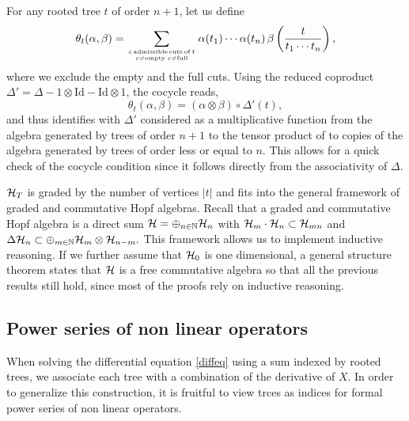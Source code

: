 \documentclass[12pt,here,feynmf]{article}
\begin{document}
For any rooted tree $t$ of order $n+1$, let us define
\begin{equation}
\theta_{t}(\alpha,\beta)=\sum_{c\,\mathrm{admissible \,cuts\, of\,}t\atop c\neq\mathrm{empty}\;c\neq\mathrm{full}
}\alpha(t_{1})\cdots\alpha(t_{n})
\,\beta\left(\frac{t}{t_{1}\cdots t_{n}}\right),
\end{equation}
where we exclude the empty and the full cuts. Using the reduced coproduct $\Delta'=\Delta-1\otimes\mathrm{Id}-\mathrm{Id}\otimes 1$, the cocycle reads, 
\begin{equation}
\theta_{t}(\alpha,\beta)=\left(\alpha\otimes\beta\right)\circ\Delta' (t),
\end{equation}
and thus identifies with $\Delta'$ considered as a multiplicative function from the algebra generated by trees of order $n+1$ to the tensor product of to copies of the algebra generated by trees of order less or equal to $n$. This allows for a quick check of the cocycle condition since it follows directly from the associativity of $\Delta$. 

${\cal H}_{T}$ is graded by the number of vertices $|t|$ and fits into the general framework of graded and commutative Hopf algebras. Recall that a graded and commutative Hopf algebra is a direct sum ${\cal H}=\oplus_{n\in{\Bbb N}}{\cal H}_{n}$ with
 $
{\cal H}_{m}\cdot {\cal H}_{n}\subset{\cal H}_{mn}
$
and
$
\Delta {\cal H}_{n}\subset\oplus_{m\in{\Bbb N}}{\cal H}_{m}\otimes{\cal H}_{n-m}.
$
This framework allows us to implement inductive reasoning.  If we further assume that ${\cal H}_{0}$ is one dimensional, a general structure theorem \cite{cartier} states that ${\cal H}$ is a free commutative algebra so that all the previous results still hold, since most of the proofs rely on inductive reasoning.  


\subsection{Power series of non linear operators}


When solving the differential equation \eqref{diffeq} using a sum indexed by rooted trees, we associate each tree with a combination of the derivative of $X$. In order to generalize this construction, it is fruitful to view trces as indices for formal power series of non linear operators. 
\end{document}
